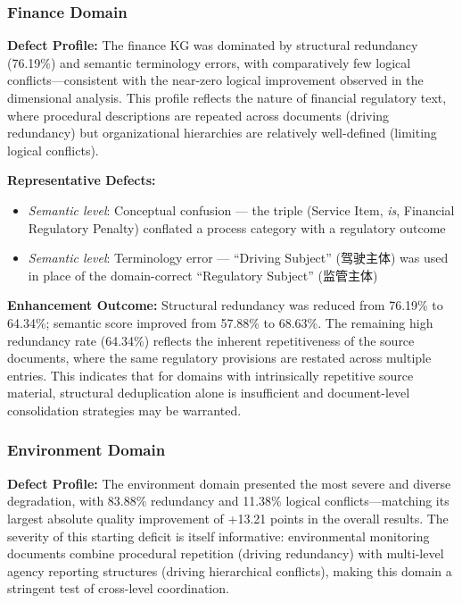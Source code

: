 \documentclass[runningheads]{llncs}
\begin{document}
\subsubsection{Finance Domain}
\textbf{Defect Profile:} The finance KG was dominated by structural redundancy (76.19\%) and semantic terminology errors, with comparatively few logical conflicts—consistent with the near-zero logical improvement observed in the dimensional analysis. This profile reflects the nature of financial regulatory text, where procedural descriptions are repeated across documents (driving redundancy) but organizational hierarchies are relatively well-defined (limiting logical conflicts).

\textbf{Representative Defects:}
\begin{itemize}
    \item \textit{Semantic level}: Conceptual confusion — the triple (Service Item, \textit{is}, Financial Regulatory Penalty) conflated a process category with a regulatory outcome
    \item \textit{Semantic level}: Terminology error — ``Driving Subject'' (驾驶主体) was used in place of the domain-correct ``Regulatory Subject'' (监管主体)
\end{itemize}

\textbf{Enhancement Outcome:} Structural redundancy was reduced from 76.19\% to 64.34\%; semantic score improved from 57.88\% to 68.63\%. The remaining high redundancy rate (64.34\%) reflects the inherent repetitiveness of the source documents, where the same regulatory provisions are restated across multiple entries. This indicates that for domains with intrinsically repetitive source material, structural deduplication alone is insufficient and document-level consolidation strategies may be warranted.

\subsubsection{Environment Domain}
\textbf{Defect Profile:} The environment domain presented the most severe and diverse degradation, with 83.88\% redundancy and 11.38\% logical conflicts—matching its largest absolute quality improvement of +13.21 points in the overall results. The severity of this starting deficit is itself informative: environmental monitoring documents combine procedural repetition (driving redundancy) with multi-level agency reporting structures (driving hierarchical conflicts), making this domain a stringent test of cross-level coordination.
\end{document}
